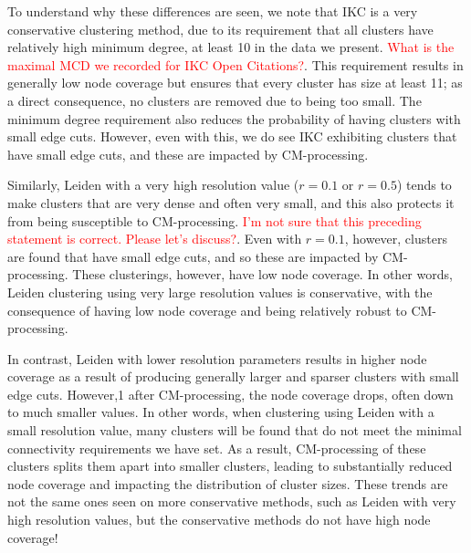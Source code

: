 \documentclass[11pt]{article}   	%
\begin{document}
To understand why these differences are seen, we note that IKC is a very conservative clustering method, due to its requirement that all clusters have relatively high minimum degree, at least 10 in the data we present. \textcolor{red}{What is the maximal MCD we recorded for IKC Open Citations?}.  This requirement results in generally low node coverage but ensures that every cluster has size at least 11; as a direct consequence, no clusters are removed due to being too small. 
The minimum degree requirement also reduces the probability of having clusters with small edge cuts. However, even with this, we do see IKC exhibiting clusters that have small edge cuts, and these are impacted by CM-processing. 

Similarly, Leiden with a very high resolution value ($r=0.1$ or $r=0.5$) tends to make clusters that are very dense and often very small, and this also protects it from being susceptible to CM-processing.  \textcolor{red}{I'm not sure that this preceding statement is correct. Please let's discuss?}. Even with $r=0.1$, however, clusters are found that have small edge cuts, and so these are impacted by CM-processing.
These clusterings, however, have low node coverage. 
In other words, Leiden clustering using very large resolution values is conservative, with the consequence of having low node coverage and being relatively robust to CM-processing.

In contrast, Leiden with lower resolution parameters results in higher node coverage as a result of producing generally larger  and sparser clusters with small edge cuts.
However,1 after CM-processing, the node coverage drops, often down to much smaller values.
In other words, when clustering using Leiden with a small resolution value, many clusters will be found that do not meet the minimal connectivity requirements we have set.
As a result, CM-processing of these clusters splits them apart into smaller clusters, leading to substantially reduced node coverage and impacting the distribution of cluster sizes.
These trends are not the same ones seen on more conservative methods, such as Leiden with very high resolution values, but the conservative methods do not have high node coverage!
\end{document}
